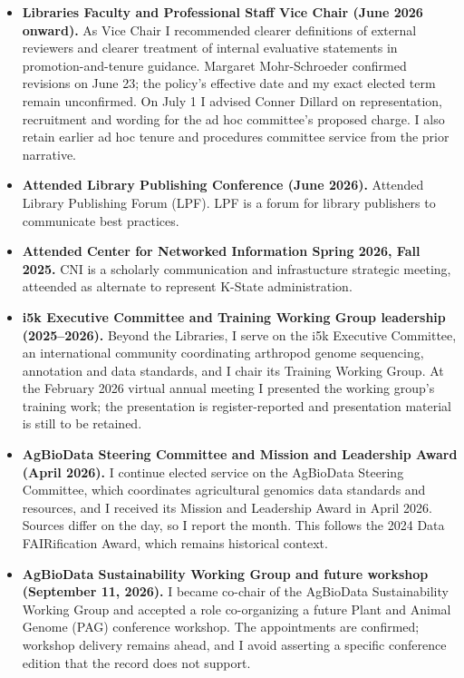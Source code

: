 \begin{itemize}
\item \textbf{Libraries Faculty and Professional Staff Vice Chair (June 2026 onward).} As Vice Chair I recommended clearer definitions of external reviewers and clearer treatment of internal evaluative statements in promotion-and-tenure guidance. Margaret Mohr-Schroeder confirmed revisions on June 23; the policy's effective date and my exact elected term remain unconfirmed. On July 1 I advised Conner Dillard on representation, recruitment and wording for the ad hoc committee's proposed charge. I also retain earlier ad hoc tenure and procedures committee service from the prior narrative.
\item \textbf{Attended Library Publishing Conference (June 2026).} Attended Library Publishing Forum (LPF). LPF is a forum for library publishers to communicate best practices.
\item \textbf{Attended Center for Networked Information Spring 2026, Fall 2025.} CNI is a scholarly communication and infrastucture strategic meeting, atteended as alternate to represent K-State administration.
\item \textbf{i5k Executive Committee and Training Working Group leadership (2025--2026).} Beyond the Libraries, I serve on the i5k Executive Committee, an international community coordinating arthropod genome sequencing, annotation and data standards, and I chair its Training Working Group. At the February 2026 virtual annual meeting I presented the working group's training work; the presentation is register-reported and presentation material is still to be retained.
\item \textbf{AgBioData Steering Committee and Mission and Leadership Award (April 2026).} I continue elected service on the AgBioData Steering Committee, which coordinates agricultural genomics data standards and resources, and I received its Mission and Leadership Award in April 2026. Sources differ on the day, so I report the month. This follows the 2024 Data FAIRification Award, which remains historical context.
\item \textbf{AgBioData Sustainability Working Group and future workshop (September 11, 2026).} I became co-chair of the AgBioData Sustainability Working Group and accepted a role co-organizing a future Plant and Animal Genome (PAG) conference workshop. The appointments are confirmed; workshop delivery remains ahead, and I avoid asserting a specific conference edition that the record does not support.

\end{itemize}
